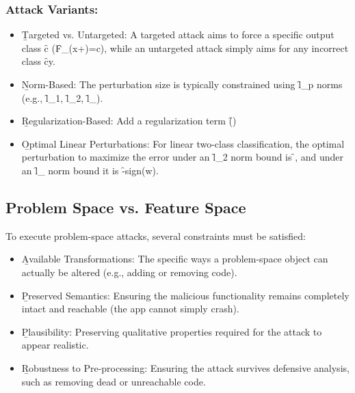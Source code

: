 \subsubsection*{Attack Variants:}
\begin{itemize}
\item \b{Targeted vs. Untargeted}: A targeted attack aims to force a specific output class \f{c} (\f{F_{\theta}(x+\delta)=c}), while an untargeted attack simply aims for any incorrect class \f{c\neq y}.
\item \b{Norm-Based}: The perturbation size is typically constrained using \f{l_p} norms (e.g., \f{l_1}, \f{l_2}, \f{l_{\infty}}).
\item \b{Regularization-Based}: Add a regularization term \f{\lambda\cdot\Omega(\delta)}
\item \b{Optimal Linear Perturbations}: For linear two-class classification, the optimal perturbation to maximize the error under an \f{l_2} norm bound is \f{}, and under an \f{l_{\infty}} norm bound it is \f{-\epsilon\cdot sign(w)}.
\end{itemize}



\subsection{Problem Space vs. Feature Space}
\vspace{1em}
To execute problem-space attacks, several constraints must be satisfied:
\begin{itemize}
\item \b{Available Transformations}: The specific ways a problem-space object can actually be altered (e.g., adding or removing code).
\item \b{Preserved Semantics}: Ensuring the malicious functionality remains completely intact and reachable (the app cannot simply crash).
\item \b{Plausibility}: Preserving qualitative properties required for the attack to appear realistic.
\item \b{Robustness to Pre-processing}: Ensuring the attack survives defensive analysis, such as removing dead or unreachable code.
\end{itemize}




